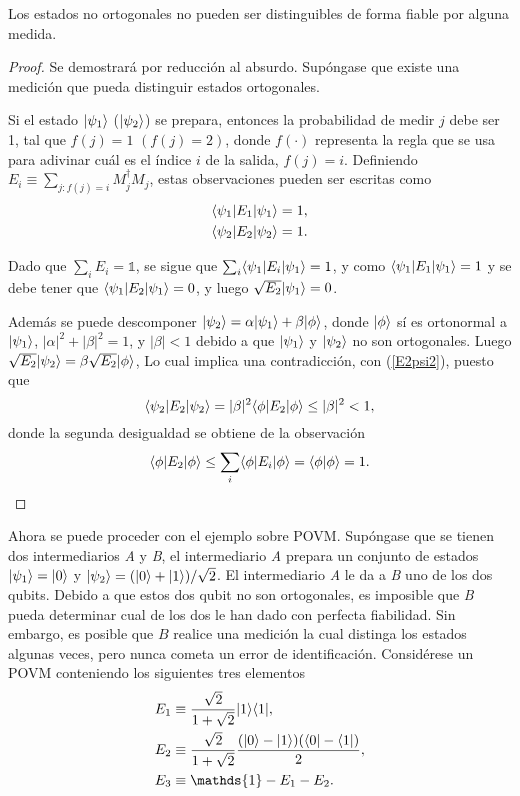 \begin{proposition}
Los estados no ortogonales no pueden ser distinguibles de forma fiable por alguna medida.
\end{proposition}
\begin{proof}
Se demostrará por reducción al absurdo. Supóngase que existe una medición que
pueda distinguir estados ortogonales.

Si el estado $|\psi_1\rangle $ ($|\psi_2\rangle $) se prepara, entonces la
probabilidad de medir $j$ debe ser 1, tal que  $f(j) =1$ $(f(j)=2)$, donde $f(\cdot)$ representa
la regla que se usa para adivinar cuál es el índice $i$ de la salida, $f(j)=i$. 
Definiendo $E_i\equiv \sum_{j:f(j)=i}M_j^\dagger M_j$, estas observaciones pueden ser escritas como 
\begin{align}
	\langle \psi_1|E_1|\psi_1\rangle=1, \label{E1psi1} \\
	\langle \psi_2|E_2|\psi_2\rangle=1\label{E2psi2}.
\end{align}

Dado que $\sum_i E_i=\mathds{1}$, se sigue que $\sum_i \langle \psi_1|E_i|\psi_1\rangle=1$,
y como $\langle \psi_1|E_1|\psi_1\rangle=1$ y se debe tener que $\langle \psi_1|E_2|\psi_1\rangle=0$,
y luego $\sqrt{E_2}|\psi_1\rangle=0$. 


Además se puede descomponer  
$|\psi_2\rangle=\alpha|\psi_1\rangle +\beta|\phi\rangle$, donde $|\phi\rangle$ sí es ortonormal
a $|\psi_1\rangle $, $|\alpha|^2+|\beta|^2=1$, y $|\beta|<1$ debido a que $|\psi_1\rangle$
y $|\psi_2\rangle$ no son ortogonales. Luego $\sqrt{E_2}|\psi_2\rangle=\beta \sqrt{E_2}|\phi\rangle$, Lo
cual implica una contradicción, con ({\ref{E2psi2}}), puesto que \begin{equation}
	\langle \psi_2|E_2|\psi_2\rangle=|\beta|^2 \langle\phi|E_2|\phi\rangle \le |\beta|^2<1,
\end{equation} 
donde la segunda desigualdad  se obtiene de la observación \[ \langle
\phi|E_2|\phi\rangle \le \sum_i\langle \phi|E_i|\phi\rangle= \langle\phi|\phi\rangle=1. \]
\end{proof}
Ahora se puede proceder con el ejemplo sobre POVM\@. Supóngase que se tienen
dos intermediarios \textit{A} y \textit{B}, el intermediario \textit{A} prepara
un conjunto de estados $|\psi_1\rangle=|0\rangle$ y $|\psi_2\rangle=(|0\rangle
+|1\rangle)/\sqrt{2}$. El intermediario \textit{A} le da a \textit{B} uno de los
dos qubits. Debido a que estos dos qubit no son ortogonales, es imposible que
\textit{B} pueda determinar cual de los dos le han dado con perfecta
fiabilidad. Sin embargo, es posible que $B$ realice una medición la cual
distinga los estados algunas veces, pero nunca cometa un error de
identificación. Considérese un POVM conteniendo los siguientes tres elementos 
	\begin{align}
		E_1 & \equiv \dfrac{\sqrt{2}}{1+\sqrt{2}} |1\rala1|, \label{eq11} \\
		E_2 & \equiv \dfrac{\sqrt{2}}{1+\sqrt{2}} \dfrac{(|0\ra -|1\ra)(\la0|-\la1|)}{2}, \label{eq12} \\
		E_3 & \equiv \mathds{1}-E_1-E_2\label{eq13}. 
	\end{align}

